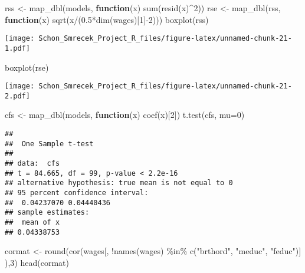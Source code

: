 \documentclass[
]{article}
\newenvironment{Shaded}{\begin{snugshade}}{\end{snugshade}}
\newcommand{\AttributeTok}[1]{\textcolor[rgb]{0.77,0.63,0.00}{#1}}
\newcommand{\ControlFlowTok}[1]{\textcolor[rgb]{0.13,0.29,0.53}{\textbf{#1}}}
\newcommand{\DecValTok}[1]{\textcolor[rgb]{0.00,0.00,0.81}{#1}}
\newcommand{\FloatTok}[1]{\textcolor[rgb]{0.00,0.00,0.81}{#1}}
\newcommand{\FunctionTok}[1]{\textcolor[rgb]{0.00,0.00,0.00}{#1}}
\newcommand{\NormalTok}[1]{#1}
\newcommand{\OtherTok}[1]{\textcolor[rgb]{0.56,0.35,0.01}{#1}}
\newcommand{\SpecialCharTok}[1]{\textcolor[rgb]{0.00,0.00,0.00}{#1}}
\newcommand{\StringTok}[1]{\textcolor[rgb]{0.31,0.60,0.02}{#1}}
\begin{document}
\begin{Shaded}
\begin{Highlighting}[]
\NormalTok{rss }\OtherTok{\textless{}{-}} \FunctionTok{map\_dbl}\NormalTok{(models, }\ControlFlowTok{function}\NormalTok{(x) }\FunctionTok{sum}\NormalTok{(}\FunctionTok{resid}\NormalTok{(x)}\SpecialCharTok{\^{}}\DecValTok{2}\NormalTok{))}
\NormalTok{rse }\OtherTok{\textless{}{-}} \FunctionTok{map\_dbl}\NormalTok{(rss, }\ControlFlowTok{function}\NormalTok{(x) }\FunctionTok{sqrt}\NormalTok{(x}\SpecialCharTok{/}\NormalTok{(}\FloatTok{0.5}\SpecialCharTok{*}\FunctionTok{dim}\NormalTok{(wages)[}\DecValTok{1}\NormalTok{]}\SpecialCharTok{{-}}\DecValTok{2}\NormalTok{)))}
\FunctionTok{boxplot}\NormalTok{(rss)}
\end{Highlighting}
\end{Shaded}

\texttt{[image: Schon\_Smrecek\_Project\_R\_files/figure-latex/unnamed-chunk-21-1.pdf]}

\begin{Shaded}
\begin{Highlighting}[]
\FunctionTok{boxplot}\NormalTok{(rse)}
\end{Highlighting}
\end{Shaded}

\texttt{[image: Schon\_Smrecek\_Project\_R\_files/figure-latex/unnamed-chunk-21-2.pdf]}

\begin{Shaded}
\begin{Highlighting}[]
\NormalTok{cfs }\OtherTok{\textless{}{-}} \FunctionTok{map\_dbl}\NormalTok{(models, }\ControlFlowTok{function}\NormalTok{(x) }\FunctionTok{coef}\NormalTok{(x)[}\DecValTok{2}\NormalTok{])}
\FunctionTok{t.test}\NormalTok{(cfs, }\AttributeTok{mu=}\DecValTok{0}\NormalTok{)}
\end{Highlighting}
\end{Shaded}

\begin{verbatim}
## 
##  One Sample t-test
## 
## data:  cfs
## t = 84.665, df = 99, p-value < 2.2e-16
## alternative hypothesis: true mean is not equal to 0
## 95 percent confidence interval:
##  0.04237070 0.04440436
## sample estimates:
##  mean of x 
## 0.04338753
\end{verbatim}

\begin{Shaded}
\begin{Highlighting}[]
\NormalTok{cormat }\OtherTok{\textless{}{-}} \FunctionTok{round}\NormalTok{(}\FunctionTok{cor}\NormalTok{(wages[, }\SpecialCharTok{!}\FunctionTok{names}\NormalTok{(wages) }\SpecialCharTok{\%in\%} \FunctionTok{c}\NormalTok{(}\StringTok{"brthord"}\NormalTok{, }\StringTok{"meduc"}\NormalTok{,    }\StringTok{"feduc"}\NormalTok{)] ),}\DecValTok{3}\NormalTok{)}
\FunctionTok{head}\NormalTok{(cormat)}
\end{Highlighting}
\end{Shaded}
\end{document}
